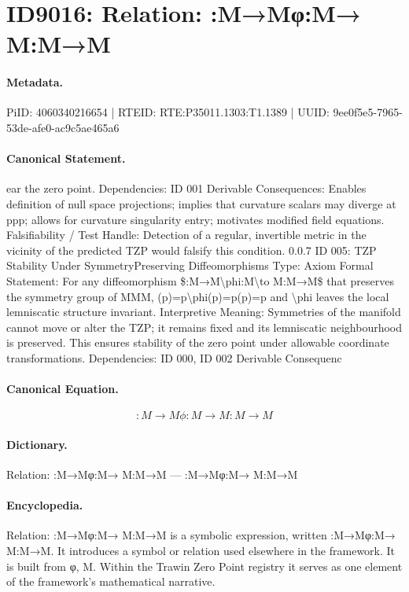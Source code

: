 \section*{ID9016: Relation: :M→Mφ:M→ M:M→M}
\paragraph{Metadata.}
PiID: 4060340216654 | RTEID: RTE:P35011.1303:T1.1389 | UUID: 9ee0f5e5-7965-53de-afe0-ac9c5ae465a6

\paragraph{Canonical Statement.}
ear the zero point. Dependencies: ID 001 Derivable Consequences: Enables definition of null space projections; implies that curvature scalars may diverge at ppp; allows for curvature singularity entry; motivates modified field equations. Falsifiability / Test Handle: Detection of a regular, invertible metric in the vicinity of the predicted TZP would falsify this condition. 0.0.7 ID 005: TZP Stability Under SymmetryPreserving Diffeomorphisms Type: Axiom Formal Statement: For any diffeomorphism \$:M→M\textbackslash{}phi:M\textbackslash{}to M:M→M\$ that preserves the symmetry group of MMM, (p)=p\textbackslash{}phi(p)=p(p)=p and \textbackslash{}phi leaves the local lemniscatic structure invariant. Interpretive Meaning: Symmetries of the manifold cannot move or alter the TZP; it remains fixed and its lemniscatic neighbourhood is preserved. This ensures stability of the zero point under allowable coordinate transformations. Dependencies: ID 000, ID 002 Derivable Consequenc

\paragraph{Canonical Equation.}
\[
:M→M\phi:M\to M:M→M
\]

\paragraph{Dictionary.}
Relation: :M→Mφ:M→ M:M→M — :M→Mφ:M→ M:M→M

\paragraph{Encyclopedia.}
Relation: :M→Mφ:M→ M:M→M is a symbolic expression, written :M→Mφ:M→ M:M→M. It introduces a symbol or relation used elsewhere in the framework. It is built from φ, M. Within the Trawin Zero Point registry it serves as one element of the framework's mathematical narrative.
